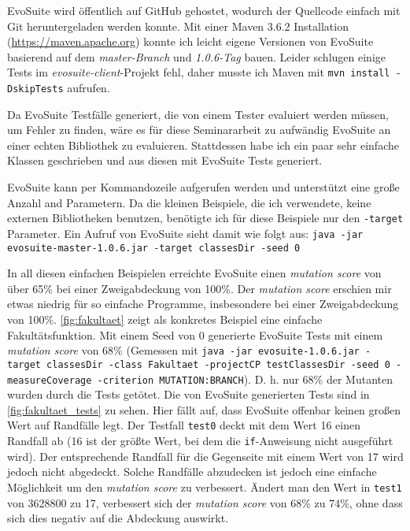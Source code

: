 \documentclass[a4paper,11pt]{article}
\begin{document}
EvoSuite wird öffentlich auf GitHub gehostet, wodurch der Quellcode einfach mit Git heruntergeladen werden konnte.
Mit einer Maven 3.6.2 Installation (\url{https://maven.apache.org}) konnte ich leicht eigene Versionen von EvoSuite basierend auf dem \textit{master-Branch} und \textit{1.0.6-Tag} bauen.
Leider schlugen einige Tests im \textit{evosuite-client}-Projekt fehl, daher musste ich Maven mit \texttt{mvn install -DskipTests} aufrufen.

Da EvoSuite Testfälle generiert, die von einem Tester evaluiert werden müssen, um Fehler zu finden, wäre es für diese Seminararbeit zu aufwändig EvoSuite an einer echten Bibliothek zu evaluieren.
Stattdessen habe ich ein paar sehr einfache Klassen geschrieben und aus diesen mit EvoSuite Tests generiert.

EvoSuite kann per Kommandozeile aufgerufen werden und unterstützt eine große Anzahl and Parametern.
Da die kleinen Beispiele, die ich verwendete, keine externen Bibliotheken benutzen, benötigte ich für diese Beispiele nur den \texttt{-target} Parameter.
Ein Aufruf von EvoSuite sieht damit wie folgt aus: \texttt{java -jar evosuite-master-1.0.6.jar -target classesDir -seed 0}

In all diesen einfachen Beispielen erreichte EvoSuite einen \textit{mutation score} von über 65\% bei einer Zweigabdeckung von 100\%.
Der \textit{mutation score} erschien mir etwas niedrig für so einfache Programme, insbesondere bei einer Zweigabdeckung von 100\%.
\cref{fig:fakultaet} zeigt als konkretes Beispiel eine einfache Fakultätsfunktion.
Mit einem Seed von 0 generierte EvoSuite Tests mit einem \textit{mutation score} von 68\% (Gemessen mit \texttt{java -jar evosuite-1.0.6.jar -target classesDir -class Fakultaet -projectCP testClassesDir -seed 0 -measureCoverage -criterion MUTATION:BRANCH}).
D. h. nur 68\% der Mutanten wurden durch die Tests getötet.
Die von EvoSuite generierten Tests sind in \cref{fig:fakultaet_tests} zu sehen.
Hier fällt auf, dass EvoSuite offenbar keinen großen Wert auf Randfälle legt.
Der Testfall \texttt{test0} deckt mit dem Wert 16 einen Randfall ab (16 ist der größte Wert, bei dem die \lstinline{if}-Anweisung nicht ausgeführt wird).
Der entsprechende Randfall für die Gegenseite mit einem Wert von 17 wird jedoch nicht abgedeckt.
Solche Randfälle abzudecken ist jedoch eine einfache Möglichkeit um den \textit{mutation score} zu verbessert.
Ändert man den Wert in \texttt{test1} von 3628800 zu 17, verbessert sich der \textit{mutation score} von 68\% zu 74\%, ohne dass sich dies negativ auf die Abdeckung auswirkt.
\end{document}
